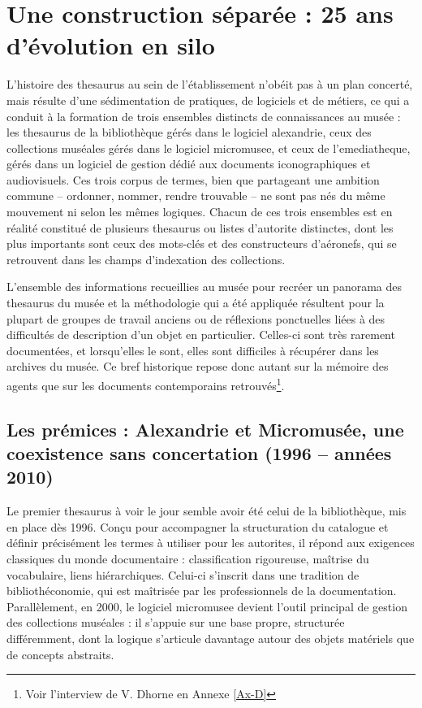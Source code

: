 \section{\label{II-A-1}Une construction séparée : 25 ans d'évolution en silo}

L'histoire des \gls{thesaurus} au sein de l'établissement n'obéit pas à un plan concerté, mais résulte d'une sédimentation de pratiques, de logiciels et de métiers, ce qui a conduit à la formation de trois ensembles distincts de connaissances au musée : les \gls{thesaurus} de la bibliothèque gérés dans le logiciel \gls{alexandrie}, ceux des collections muséales gérés dans le logiciel \gls{micromusee}, et ceux de l'\gls{emediatheque}, gérés dans un logiciel de gestion dédié aux documents iconographiques et audiovisuels. Ces trois corpus de termes, bien que partageant une ambition commune – ordonner, nommer, rendre trouvable – ne sont pas nés du même mouvement ni selon les mêmes logiques. Chacun de ces trois ensembles est en réalité constitué de plusieurs \gls{thesaurus} ou listes d'\gls{autorite} distinctes, dont les plus importants sont ceux des mots-clés et des constructeurs d'aéronefs, qui se retrouvent dans les champs d'indexation des collections.

L'ensemble des informations recueillies au musée pour recréer un panorama des \gls{thesaurus} du musée et la méthodologie qui a été appliquée résultent pour la plupart de groupes de travail anciens ou de réflexions ponctuelles liées à des difficultés de description d'un objet en particulier. Celles-ci sont très rarement documentées, et lorsqu'elles le sont, elles sont difficiles à récupérer dans les archives du musée. Ce bref historique repose donc autant sur la mémoire des agents que sur les documents contemporains retrouvés\footnote{Voir l'interview de V. Dhorne en Annexe \ref{Ax-D}}.

\subsection{Les prémices : Alexandrie et Micromusée, une coexistence sans concertation (1996 – années 2010)}

Le premier \gls{thesaurus} à voir le jour semble avoir été celui de la bibliothèque, mis en place dès 1996. Conçu pour accompagner la structuration du catalogue et définir précisément les termes à utiliser pour les \glspl{autorite}, il répond aux exigences classiques du monde documentaire : classification rigoureuse, maîtrise du vocabulaire, liens hiérarchiques. Celui-ci s'inscrit dans une tradition de bibliothéconomie, qui est maîtrisée par les professionnels de la documentation. Parallèlement, en 2000, le logiciel \gls{micromusee} devient l'outil principal de gestion des collections muséales : il s'appuie sur une base propre, structurée différemment, dont la logique s'articule davantage autour des objets matériels que de concepts abstraits.

